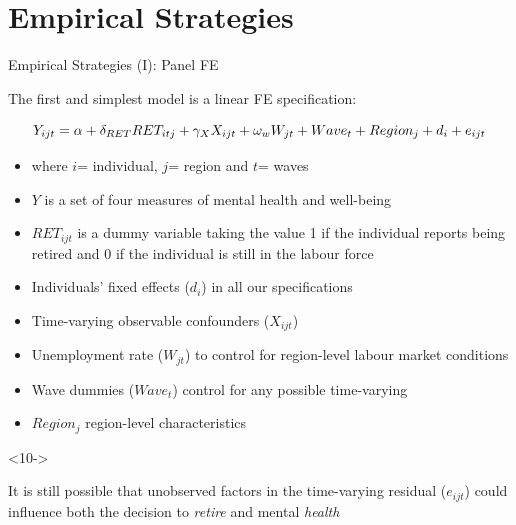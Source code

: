 \documentclass{beamer}
\begin{document}
\section{Empirical Strategies}

\begin{frame}{Empirical Strategies (I): Panel FE}
\footnotesize

 The first and simplest model is a \begingroup\color{Blue}linear FE  \endgroup specification:
\vspace{-0.25cm}

\begin{equation}
\label{eq1}
\centering
  Y_{ijt} =\alpha + \delta_{RET} RET_{itj} + \gamma_X X_{ijt} + \omega_w W_{jt} + Wave_{t} + Region_j + d_i + e_{ijt} 
\end{equation}


\begin{itemize}
\scriptsize
\item<2-> where $i$= individual, $j$= region and $t$= waves

\item<3-> $Y$ is a set of four measures of mental health and well-being
\item<4-> $RET_{ijt}$ is a dummy variable taking the value 1 if the individual reports being retired and 0 if the individual is still in the labour force

\item<5-> Individuals' fixed effects ($d_i$) in all our specifications 

\item<6-> Time-varying observable confounders ($X_{ijt}$) 

\item<7-> Unemployment rate ($W_{jt}$) to control for region-level labour market conditions

\item<8-> Wave dummies ($Wave_t$) control for any possible time-varying

\item<9-> $Region_j$ region-level characteristics%
\end{itemize}
\vspace*{-0.15cm}

\begin{block}<10->

\scriptsize
\centering
It is still possible that \begingroup\color{Blue}unobserved factors \endgroup in the time-varying residual ($e_{ijt}$) could \begingroup\color{Blue}influence \endgroup both the decision to \textit{retire} and mental \textit{health}
\end{block}

\end{frame}
\end{document}
